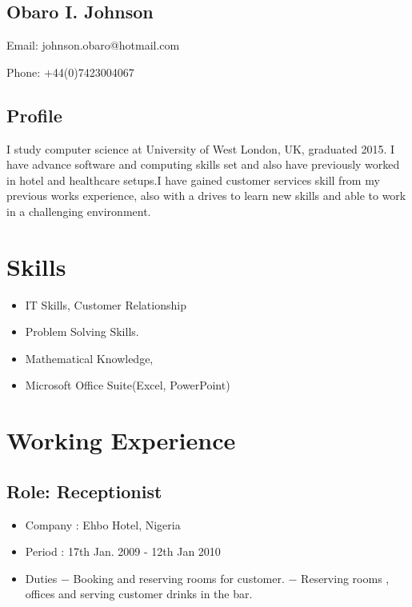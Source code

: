 \documentclass[11px]{article}
\begin{document}
	\begin{center}
	\section*{Obaro I. Johnson}
	Email: johnson.obaro@hotmail.com
	
    Phone: $+$44(0)7423004067
    \end{center}
   \makebox[\linewidth]{\rule{\paperwidth}{0.1pt}}
	
	\subsection*{Profile}
	I study computer science at University of West London, UK, graduated 2015. I have advance software and computing skills set and also have previously worked in hotel and healthcare setups.I have gained customer services skill from my previous works experience,  also with 
	a drives to learn new skills and able to work  in a challenging environment.
	
\section*{Skills}
 \begin{itemize}
 	\item IT Skills, Customer Relationship
 	\item Problem Solving Skills.
 	\item Mathematical Knowledge,
 	\item Microsoft Office Suite(Excel, PowerPoint)
 	
 \end{itemize}
 \hrulefill
  \section*{Working Experience}
  
  \subsection*{Role: Receptionist}
  \begin{itemize}
  	\item  Company : Ehbo  Hotel, Nigeria
  	\item Period   : 17th Jan. 2009  -  12th Jan 2010
  	\item Duties
  	$-$ Booking  and reserving rooms for customer.
  	$-$ Reserving rooms , offices  and serving customer drinks in the bar.
  	
  \end{itemize}
  
\end{document}
